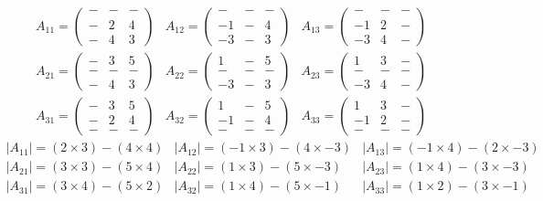 \documentclass{article}
\begin{document}
\[
	\begin{matrix}
				A_{11} = 
				\begin{pmatrix}
					- & - & -\\
					- & 2 & 4\\
					- & 4 & 3
				\end{pmatrix}
			&
				A_{12} = 
				\begin{pmatrix}
					- & - & -\\
					-1 & - & 4\\
					-3 & - & 3
				\end{pmatrix}
			&
				A_{13} = 
				\begin{pmatrix}
					- & - & -\\
					-1 & 2 & -\\
					-3 & 4 & -
				\end{pmatrix}
		\\
				A_{21} = 
				\begin{pmatrix}
					- & 3 & 5\\
					- & - & -\\
					- & 4 & 3
				\end{pmatrix}
			&
				A_{22} = 
				\begin{pmatrix}
					1 & - & 5\\
					- & - & -\\
					-3 & - & 3
				\end{pmatrix}
			&
				A_{23} = 
				\begin{pmatrix}
					1 & 3 & -\\
					- & - & -\\
					-3 & 4 & -
				\end{pmatrix}
		\\
				A_{31} = 
				\begin{pmatrix}
					- & 3 & 5\\
					- & 2 & 4\\
					- & - & -
				\end{pmatrix}
			&
				A_{32} = 
				\begin{pmatrix}
					1 & - & 5\\
					-1 & - & 4\\
					- & - & -
				\end{pmatrix}
			&
				A_{33} = 
				\begin{pmatrix}
					1 & 3 & -\\
					-1 & 2 & -\\
					- & - & -
				\end{pmatrix}
	\end{matrix}
\]
\[
	\begin{matrix}
		|A_{11}| = (2\times3)-(4\times4) & |A_{12}| = (-1\times3)-(4\times-3) & |A_{13}| = (-1\times4)-(2\times-3)\\
		|A_{21}| = (3\times3)-(5\times4) & |A_{22}| = (1\times3)-(5\times-3) & |A_{23}| = (1\times4)-(3\times-3)\\
		|A_{31}| = (3\times4)-(5\times2) & |A_{32}| = (1\times4)-(5\times-1) & |A_{33}| = (1\times2)-(3\times-1)
	\end{matrix}
\]
\end{document}
